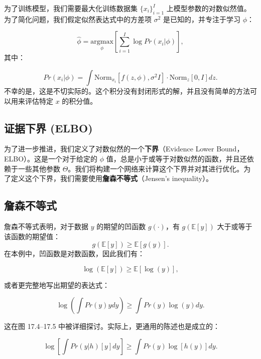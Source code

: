 为了训练模型，我们需要最大化训练数据集 \(\{x_i\}_{i=1}^I\) 上模型参数的对数似然值。为了简化问题，我们假定似然表达式中的方差项 \(\sigma^2\) 是已知的，并专注于学习 \(\phi\)：

\begin{equation}
\hat{\phi} = \underset{\phi}{\mathrm{argmax}} \left[ \sum_{i=1}^I \log Pr(x_i|\phi) \right], 
\end{equation}
其中：

\begin{equation}
Pr(x_i|\phi) = \int \text{Norm}_{x_i} \left[ f(z, \phi), \sigma^2 I \right] \cdot \text{Norm}_z [0, I] dz. 
\end{equation}
不幸的是，这是不切实际的。这个积分没有封闭形式的解，并且没有简单的方法可以用来评估特定 \(x\) 的积分值。

\subsection{证据下界 (ELBO)}

为了进一步推进，我们定义了对数似然的一个\textbf{下界}（Evidence Lower Bound，ELBO）。这是一个对于给定的 \(\phi\) 值，总是小于或等于对数似然的函数，并且还依赖于一些其他参数 \(\Theta\)。我们将构建一个网络来计算这个下界并对其进行优化。为了定义这个下界，我们需要使用\textbf{詹森不等式}（Jensen's inequality）。

\subsection{詹森不等式}

詹森不等式表明，对于数据 \(y\) 的期望的凹函数 \(g(\cdot)\)，有 \(g(\mathbb{E}[y])\) 大于或等于该函数的期望值：
\begin{equation}
g(\mathbb{E}[y]) \geq \mathbb{E}[g(y)]. 
\end{equation}
在本例中，凹函数是对数函数，因此我们有：

\begin{equation}
\log(\mathbb{E}[y]) \geq \mathbb{E}[\log(y)], 
\end{equation}

或者更完整地写出期望的表达式：

\begin{equation}
\log \left( \int Pr(y)ydy \right) \geq \int Pr(y)\log(y)dy. 
\end{equation}

这在图 17.4–17.5 中被详细探讨。实际上，更通用的陈述也是成立的：

\begin{equation}
\log \left[ \int Pr(y|h)[y] dy \right] \geq \int Pr(y) \log[h(y)]dy. 
\end{equation}


